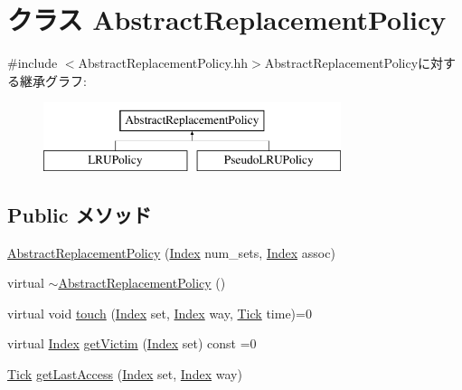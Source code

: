 \hypertarget{classAbstractReplacementPolicy}{
\section{クラス AbstractReplacementPolicy}
\label{classAbstractReplacementPolicy}
}


{\ttfamily \#include $<$AbstractReplacementPolicy.hh$>$}AbstractReplacementPolicyに対する継承グラフ:\begin{figure}[H]
\begin{center}
\leavevmode
\includegraphics[height=2cm]{classAbstractReplacementPolicy}
\end{center}
\end{figure}
\subsection*{Public メソッド}
\begin{DoxyCompactItemize}
\item 
\hyperlink{classAbstractReplacementPolicy_a5a97664620a36d345954e66ae7cdbfb0}{AbstractReplacementPolicy} (\hyperlink{TypeDefines_8hh_a39642de41f3574937f399f4fab25ba18}{Index} num\_\-sets, \hyperlink{TypeDefines_8hh_a39642de41f3574937f399f4fab25ba18}{Index} assoc)
\item 
virtual \hyperlink{classAbstractReplacementPolicy_ae72a8485ba00ae76c66dd66ddebb07ff}{$\sim$AbstractReplacementPolicy} ()
\item 
virtual void \hyperlink{classAbstractReplacementPolicy_a6354174153ace07b8cef20f36b20357a}{touch} (\hyperlink{TypeDefines_8hh_a39642de41f3574937f399f4fab25ba18}{Index} set, \hyperlink{TypeDefines_8hh_a39642de41f3574937f399f4fab25ba18}{Index} way, \hyperlink{base_2types_8hh_a5c8ed81b7d238c9083e1037ba6d61643}{Tick} time)=0
\item 
virtual \hyperlink{TypeDefines_8hh_a39642de41f3574937f399f4fab25ba18}{Index} \hyperlink{classAbstractReplacementPolicy_a100bd69954d47ece014cbd697a1f8d7f}{getVictim} (\hyperlink{TypeDefines_8hh_a39642de41f3574937f399f4fab25ba18}{Index} set) const =0
\item 
\hyperlink{base_2types_8hh_a5c8ed81b7d238c9083e1037ba6d61643}{Tick} \hyperlink{classAbstractReplacementPolicy_afbe88ba793f4549f1c7ef274372433e9}{getLastAccess} (\hyperlink{TypeDefines_8hh_a39642de41f3574937f399f4fab25ba18}{Index} set, \hyperlink{TypeDefines_8hh_a39642de41f3574937f399f4fab25ba18}{Index} way)
\end{DoxyCompactItemize}
